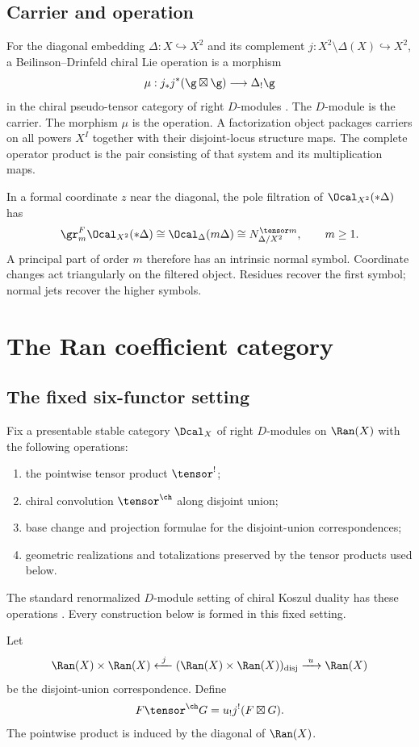 \section{Carrier and operation}
For the diagonal embedding $\Delta:X\hookrightarrow X^2$ and its complement $j:X^2\setminus\Delta(X)\hookrightarrow X^2$, a Beilinson--Drinfeld chiral Lie operation is a morphism
\[
 \mu:j_*j^*(\g\boxtimes\g)\longrightarrow \Delta_!\g
\]
in the chiral pseudo-tensor category of right $D$-modules \cite{BD04}. The $D$-module is the carrier. The morphism $\mu$ is the operation. A factorization object packages carriers on all powers $X^I$ together with their disjoint-locus structure maps. The complete operator product is the pair consisting of that system and its multiplication maps.

In a formal coordinate $z$ near the diagonal, the pole filtration of $\Ocal_{X^2}(*\Delta)$ has
\[
 \gr_m^F\Ocal_{X^2}(*\Delta)
 \cong \Ocal_{\Delta}(m\Delta)
 \cong N_{\Delta/X^2}^{\tensor m},\qquad m\ge 1.
\]
A principal part of order $m$ therefore has an intrinsic normal symbol. Coordinate changes act triangularly on the filtered object. Residues recover the first symbol; normal jets recover the higher symbols.

\chapter{The Ran coefficient category}
\section{The fixed six-functor setting}
Fix a presentable stable category $\Dcal_X$ of right $D$-modules on $\Ran(X)$ with the following operations:
\begin{enumerate}
\item the pointwise tensor product $\tensor^{!}$;
\item chiral convolution $\tensor^{\ch}$ along disjoint union;
\item base change and projection formulae for the disjoint-union correspondences;
\item geometric realizations and totalizations preserved by the tensor products used below.
\end{enumerate}
The standard renormalized $D$-module setting of chiral Koszul duality has these operations \cite{FG12}. Every construction below is formed in this fixed setting.

Let
\[
  \Ran(X)\times\Ran(X) \xleftarrow{\ j\ }
  (\Ran(X)\times\Ran(X))_{\mathrm{disj}}
  \xrightarrow{\ u\ }\Ran(X)
\]
be the disjoint-union correspondence. Define
\[
 F\tensor^{\ch}G=u_!j^!(F\boxtimes G).
\]
The pointwise product is induced by the diagonal of $\Ran(X)$.

